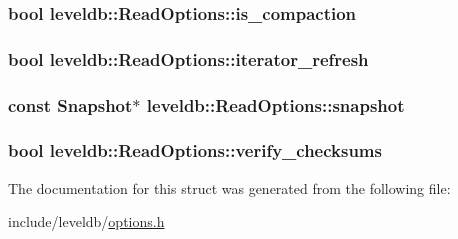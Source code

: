\subsubsection[{is\+\_\+compaction}]{\setlength{\rightskip}{0pt plus 5cm}bool leveldb\+::\+Read\+Options\+::is\+\_\+compaction\hspace{0.3cm}{\ttfamily [private]}}\label{structleveldb_1_1_read_options_a7b49e4ea8d594b49ba3ae1a122f9ad66}
\hypertarget{structleveldb_1_1_read_options_a965fa3fa49e0b637a7925cf644c3d01f}{}
\subsubsection[{iterator\+\_\+refresh}]{\setlength{\rightskip}{0pt plus 5cm}bool leveldb\+::\+Read\+Options\+::iterator\+\_\+refresh}\label{structleveldb_1_1_read_options_a965fa3fa49e0b637a7925cf644c3d01f}
\hypertarget{structleveldb_1_1_read_options_a1fa3fffc267dff89fce7c39d7c7b5b50}{}
\subsubsection[{snapshot}]{\setlength{\rightskip}{0pt plus 5cm}const {\bf Snapshot}$\ast$ leveldb\+::\+Read\+Options\+::snapshot}\label{structleveldb_1_1_read_options_a1fa3fffc267dff89fce7c39d7c7b5b50}
\hypertarget{structleveldb_1_1_read_options_a43731d67b707995e20571ad33c1f53f2}{}
\subsubsection[{verify\+\_\+checksums}]{\setlength{\rightskip}{0pt plus 5cm}bool leveldb\+::\+Read\+Options\+::verify\+\_\+checksums}\label{structleveldb_1_1_read_options_a43731d67b707995e20571ad33c1f53f2}


The documentation for this struct was generated from the following file\+:\begin{DoxyCompactItemize}
\item 
include/leveldb/\hyperlink{options_8h}{options.\+h}\end{DoxyCompactItemize}

